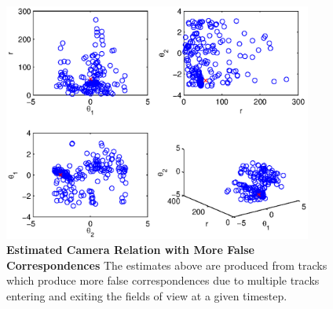 \documentclass[journal]{IEEEtran}
\begin{document}
	\begin{figure}[]
		\centering
		\includegraphics[width=4in]{./noisy_point_cloud.eps}
		\caption{\textbf{Estimated Camera Relation with More False Correspondences} 
					The estimates above are produced from tracks which produce
					more false correspondences due to multiple tracks entering and
					exiting the fields of view at a given timestep.}
		\label{noisy_point_cloud}
	\end{figure}


\end{document}
